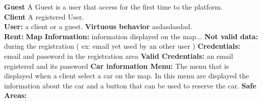 \textbf{Guest}
A Guest is a user that access for the first time to the platform.\\
\textbf{Client}
A registered User.\\
\textbf{User:}
a client or a guest.
\textbf{Virtuous  behavior}
asdasdasdad.\\
\textbf{Rent:}
\textbf{Map Information:}
information displayed on the map...
\textbf{Not valid data:}
during the registration ( ex: email yet used by an other user ) 
\textbf{Credentials:}
email and password in the registration area
\textbf{Valid Credentials:}
an email registered and its password 
\textbf{Car information Menu:}
The menu that is displayed when a client select a car on the map. In this menu are displayed the information about the car and a button that can be used to reserve the car.
\textbf{Safe Areas:}
